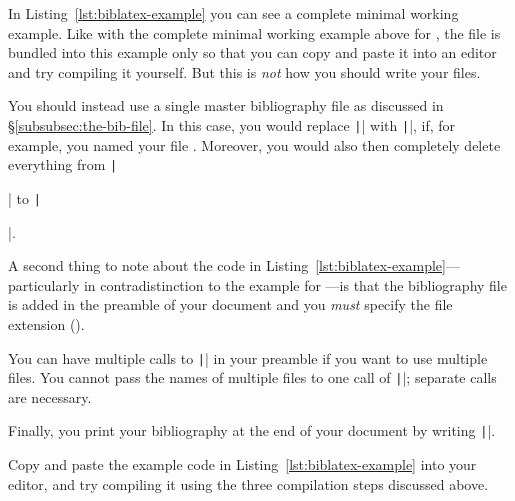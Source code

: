 In Listing~\ref{lst:biblatex-example} you can see a complete minimal working example.
Like with the complete minimal working example above for , the  file is bundled into this example only so that you can copy and paste it into an editor and try compiling it yourself.
But this is \emph{not} how you should write your  files.

You should instead use a single master bibliography file as discussed in \S\ref{subsubsec:the-bib-file}.
In this case, you would replace \texttt|| with \texttt||, if, for example, you named your  file .
Moreover, you would also then completely delete everything from \texttt|\begin{filecontents}| to \texttt|\end{filecontents}|.

A second thing to note about the code in Listing~\ref{lst:biblatex-example}---particularly in contradistinction to the example for ---is that the bibliography file is added in the preamble of your document and you \emph{must} specify the file extension ().

You can have multiple calls to \texttt|| in your preamble if you want to use multiple  files.
You cannot pass the names of multiple  files to one call of \texttt||; separate calls are necessary.

Finally, you print your bibliography at the end of your document by writing \texttt|\printbibliography|.

Copy and paste the example code in Listing~\ref{lst:biblatex-example} into your editor, and try compiling it using the three compilation steps discussed above.

